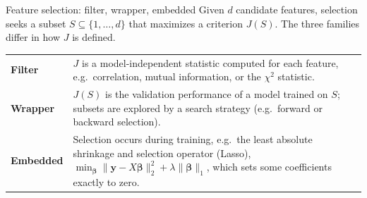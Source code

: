 \begin{frame}{Feature selection: filter, wrapper, embedded}
\begingroup\small
Given $d$ candidate features, selection seeks a subset $S \subseteq \{1, \dots, d\}$ that maximizes a criterion $J(S)$. The three families differ in how $J$ is defined.
\par\endgroup
\vspace{0.5em}
\begin{tabularx}{\textwidth}{>{\bfseries}l X}
Filter & $J$ is a model-independent statistic computed for each feature, e.g.\ correlation, mutual information, or the $\chi^2$ statistic. \\
\addlinespace[0.3em]
Wrapper & $J(S)$ is the validation performance of a model trained on $S$; subsets are explored by a search strategy (e.g.\ forward or backward selection). \\
\addlinespace[0.3em]
Embedded & Selection occurs during training, e.g.\ the least absolute shrinkage and selection operator (Lasso), $\min_{\boldsymbol\beta} \|\mathbf{y} - X\boldsymbol\beta\|_2^2 + \lambda\|\boldsymbol\beta\|_1$, which sets some coefficients exactly to zero. \\
\bottomrule
\end{tabularx}
\coursefooter
\end{frame}

